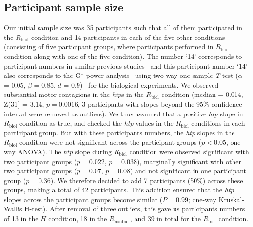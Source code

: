\documentclass[a4paper, 12pt, oneside]{Thesis}  %
\begin{document}
\subsection{Participant sample size}
Our initial sample size was 35 participants such that all of them participated in the $R_{\text{biol}}$ condition and 14 participants in each of the five other conditions (consisting of five participant groups, where participants performed in $R_{\text{biol}}$ condition along with one of the five condition). The number `14' corresponds to participant numbers in similar previous studies~\cite{Bisio:PlosOne:2010, Bisio:PlosOne:2014} and this participant number `14' also corresponds to the G* power analysis~\cite{Erdfelder:JBRMIC:1996} using two-way one sample {\it T}-test ($\alpha$ = 0.05, $\beta$ = 0.85, $d$ = 0.9)~\cite{Verma:power_analysis:2017} for the biological experiments. We observed substantial motor contagions in the {\it htp}s in the $R_{\text{biol}}$ condition (median = 0.014, Z(31) = 3.14, $p = 0.0016$, 3 participants with slopes beyond the 95\% confidence interval were removed as outliers). We thus assumed that a positive {\it htp} slope in $R_{\text{biol}}$ condition as true, and checked the {\it htp} values in the $R_{\text{biol}}$ conditions in each participant group. But with these participants numbers, the {\it htp} slopes in the $R_{\text{biol}}$ condition were not significant across the participant groups ($p<0.05$, one-way ANOVA). The {\it htp} slope during $R_{\text{biol}}$ condition were observed significant with two participant groups ($p = 0.022$, $p = 0.038$), marginally significant with other two participant groups ($p = 0.07$, $p = 0.08$) and not significant in one participant group ($p = 0.36$). We therefore decided to add 7 participants (50\%) across these groups, making a total of 42 participants. This addition ensured that the {\it htp} slopes across the participant groups become similar ($P = 0.99$; one-way Kruskal-Wallis H-test). After removal of three outliers, this gave us participants numbers of 13 in the $H$ condition, 18 in the $R_{\text{nonbiol}}$, and 39 in total for the $R_{\text{biol}}$ condition.
\end{document}
